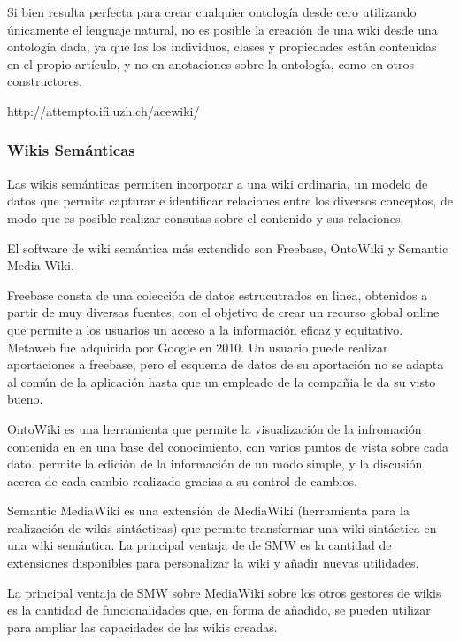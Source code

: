 Si bien resulta perfecta para crear cualquier ontología desde cero utilizando únicamente el lenguaje natural, no es posible la creación de una wiki desde una ontología dada, ya que las los individuos, clases y propiedades están contenidas en el propio artículo, y no en anotaciones sobre la ontología, como en otros constructores.

http://attempto.ifi.uzh.ch/acewiki/

\subsubsection{Wikis Semánticas} Las wikis semánticas permiten incorporar a una wiki ordinaria, un modelo de datos que permite capturar e identificar relaciones entre los diversos conceptos, de modo que es posible realizar consutas sobre el contenido y sus relaciones.

	El software de wiki semántica más extendido son Freebase, OntoWiki y Semantic Media Wiki.
	
	Freebase consta de una colección de datos estrucutrados en linea, obtenidos a partir de muy diversas fuentes, con el objetivo de crear un recurso global online que permite a los usuarios un acceso a la información eficaz y equitativo. Metaweb fue adquirida por Google en 2010. Un usuario puede realizar aportaciones a freebase, pero el esquema de datos de su aportación no se adapta al común de la aplicación hasta que un empleado de la compañia le da su visto bueno. 
	
	OntoWiki es una herramienta que permite la visualización de la infromación contenida en en una base del conocimiento, con varios puntos de vista sobre cada dato. permite la edición de la información de un modo simple,  y la discusión acerca de cada cambio realizado gracias a su control de cambios. 
	
	Semantic MediaWiki es una extensión de MediaWiki (herramienta para la realización de wikis sintácticas) que permite transformar una wiki sintáctica en una wiki semántica. La principal ventaja de de SMW es la cantidad de extensiones disponibles para personalizar la wiki y añadir nuevas utilidades.
	
	La principal ventaja de SMW sobre MediaWiki sobre los otros gestores de wikis es la cantidad de funcionalidades que, en forma de añadido, se pueden utilizar para ampliar las capacidades de las wikis creadas.
	
